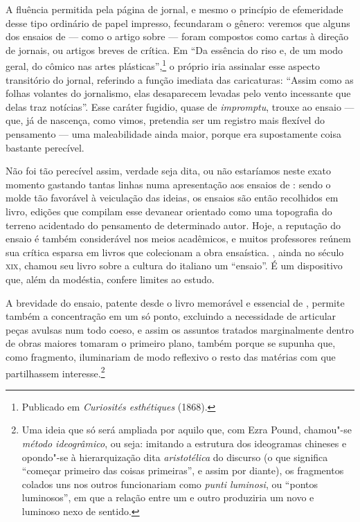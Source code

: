 A fluência permitida pela página de jornal, e mesmo o princípio de
efemeridade desse tipo ordinário de papel impresso, fecundaram o
gênero: veremos que alguns dos ensaios de  --- como o artigo
sobre  --- foram compostos como cartas à direção de jornais, ou
artigos breves de crítica. Em “Da essência do riso e, de um modo geral,
do cômico nas artes plásticas”,\footnote{ Publicado em
\textit{Curiosités esthétiques} (1868).} o próprio  iria
assinalar esse aspecto transitório do jornal, referindo a função
imediata das caricaturas: “Assim como as folhas volantes do jornalismo,
elas desaparecem levadas pelo vento incessante que delas traz
notícias”. Esse caráter fugidio, quase de \textit{impromptu}, trouxe ao
ensaio --- que, já de nascença, como vimos, pretendia ser um registro
mais flexível do pensamento --- uma maleabilidade ainda maior, porque era
supostamente coisa bastante perecível.

Não foi tão perecível assim, verdade seja dita, ou não estaríamos neste
exato momento gastando tantas linhas numa apresentação aos ensaios de
: sendo o molde tão favorável à veiculação das ideias, os
ensaios são então recolhidos em livro, edições que compilam esse
devanear orientado como uma topografia do terreno acidentado do
pensamento de determinado autor. Hoje, a reputação do ensaio é também
considerável nos meios acadêmicos, e muitos professores reúnem sua
crítica esparsa em livros que colecionam a obra ensaística. , 
ainda no século \textsc{xix}, chamou seu livro sobre a cultura do
 italiano um “ensaio”. É um dispositivo que, além da
modéstia, confere limites ao estudo.

A brevidade do ensaio, patente desde o livro memorável e essencial de
, permite também a concentração em um só ponto, excluindo a
necessidade de articular peças avulsas num todo coeso, e assim os
assuntos tratados marginalmente dentro de obras maiores tomaram o
primeiro plano, também porque se supunha que, como fragmento,
iluminariam de modo reflexivo o resto das matérias com que partilhassem
interesse.\footnote{ Uma ideia que só será ampliada por aquilo que, com
Ezra Pound, chamou"-se \textit{método ideogrâmico}, ou seja: imitando a  
estrutura dos ideogramas chineses e opondo"-se à hierarquização
dita \textit{aristotélica} do discurso (o que significa “começar
primeiro das coisas primeiras”, e assim por diante), os fragmentos
colados uns nos outros funcionariam como \textit{punti luminosi}, ou
“pontos luminosos”, em que a relação entre um e outro produziria um
novo e luminoso nexo de sentido.} 

